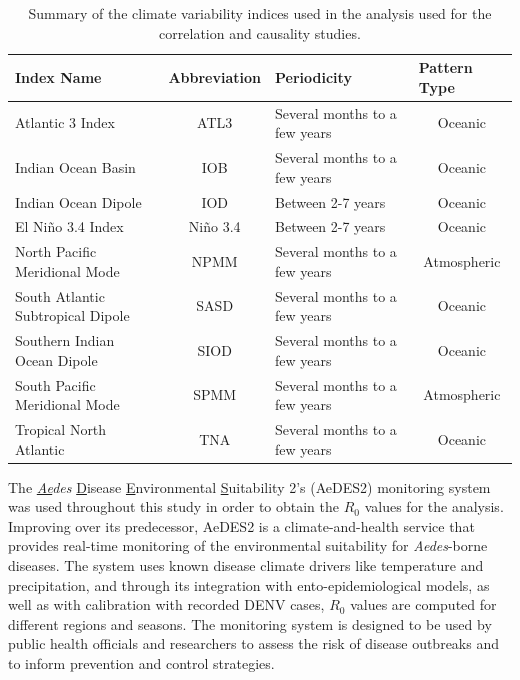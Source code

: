 \documentclass[10pt,twocolumn]{wlscirep}
\begin{document}
\begin{table}[t]
  \centering
  \begin{tabular}{l|c|l|c}
    \textbf{Index Name}               & \multicolumn{1}{l|}{\textbf{Abbreviation}} & \textbf{Periodicity}          & \multicolumn{1}{l|}{\textbf{Pattern Type}} \\ \hline
    Atlantic 3 Index                  & ATL3                                       & Several months to a few years & Oceanic                                    \\
    Indian Ocean Basin                & IOB                                        & Several months to a few years & Oceanic                                    \\
    Indian Ocean Dipole               & IOD                                        & Between 2-7 years             & Oceanic                                    \\
    El Niño 3.4 Index                 & Niño 3.4                                   & Between 2-7 years             & Oceanic                                    \\
    North Pacific Meridional Mode     & NPMM                                       & Several months to a few years & Atmospheric                                \\
    South Atlantic Subtropical Dipole & SASD                                       & Several months to a few years & Oceanic                                    \\
    Southern Indian Ocean Dipole      & SIOD                                       & Several months to a few years & Oceanic                                    \\
    South Pacific Meridional Mode     & SPMM                                       & Several months to a few years & Atmospheric                                \\
    Tropical North Atlantic           & TNA                                        & Several months to a few years & Oceanic
  \end{tabular}%
  \caption{Summary of the climate variability indices used in the analysis used for the correlation and causality studies.}
  \label{tab:climate-variability-indices}
\end{table}

The \textit{\underline{Ae}des} \underline{D}isease \underline{E}nvironmental \underline{S}uitability 2's (AeDES2) monitoring system\cite{guerra_2025} was used throughout this study in order to obtain the $R_0$ values for the analysis. Improving over its predecessor\cite{munoz_2020a}, AeDES2 is a climate-and-health service that provides real-time monitoring of the environmental suitability for \textit{Aedes}-borne diseases. The system uses known disease climate drivers like temperature and precipitation, and through its integration with ento-epidemiological models, as well as with calibration with recorded DENV cases, $R_0$ values are computed for different regions and seasons. The monitoring system is designed to be used by public health officials and researchers to assess the risk of disease outbreaks and to inform prevention and control strategies.
\end{document}
